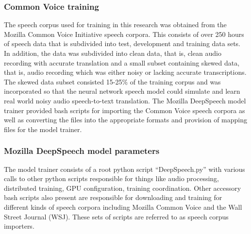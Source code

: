 \subsubsection{Common Voice training}
The speech corpus used for training in this research was obtained from the Mozilla Common Voice Initiative speech corpora.  This consists of over 250 hours of speech data that is subdivided into test, development and training data sets.  In addition, the data was subdivided into clean data, that is, clean audio recording with accurate translation and a small subset containing skewed data, that is, audio recording which was either noisy or lacking accurate transcriptions.  The skewed data subset consisted 15-25\% of the training corpus and was incorporated so that the neural network speech model could simulate and learn real world noisy audio speech-to-text translation.  The Mozilla DeepSpeech model trainer provided bash scripts for importing the Common Voice speech corpora as well as converting the files into the appropriate formats and provision of mapping files for the model trainer.
\subsubsection{Mozilla DeepSpeech model parameters}
The model trainer consists of a root python script ``DeepSpeech.py'' with various calls to other python scripts responsible for things like audio processing, distributed training, GPU configuration, training coordination.  Other accessory bash scripts also present are responsible for downloading and training for different kinds of speech corpora including Mozilla Common Voice\citep{ardila2019common} and the Wall Street Journal (WSJ)\citep{paul1992design}.  These sets of scripts are referred to as speech corpus importers. 

